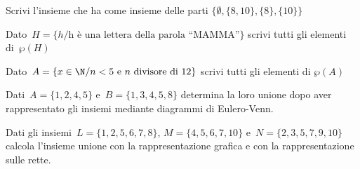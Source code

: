 \begin{esercizio}
 \label{ese:7.4}
 Scrivi l'insieme che ha come insieme delle parti
\(\{\emptyset,\{8,10\},\{8\},\{10\}\}\)
\end{esercizio}

\begin{esercizio}
 \label{ese:7.5}
Dato~\(H=\{h/\text{h è una lettera della parola ``MAMMA''}\}\) scrivi
tutti gli elementi di~\(\wp (H)\)
\end{esercizio}

\begin{esercizio}
 \label{ese:7.6}
 Dato~\(A=\{x\in\N/ n<5\text{ e }n\text{ divisore di~12}\}\) scrivi tutti gli 
elementi di
\(\wp (A)\)
\end{esercizio}


\begin{esercizio}
 \label{ese:7.7}
Dati~\(A=\{1,2,4,5\}\) e~\(B=\{1,3,4,5,8\}\) determina la loro unione dopo
aver rappresentato gli insiemi mediante diagrammi di Eulero-Venn.
 \end{esercizio}

\begin{esercizio}
 \label{ese:7.8}
 Dati gli insiemi~\(L=\{1,2,5,6,7,8\}\), \(M=\{4,5,6,7,10\}\) 
e~\(N=\{2,3,5,7,9,10\}\)
calcola l'insieme unione con la rappresentazione grafica e con la 
rappresentazione sulle rette.
%  
\end{esercizio}

